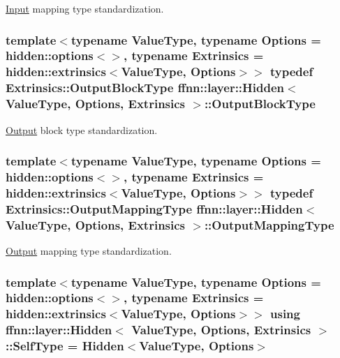 \hyperlink{classffnn_1_1layer_1_1_input}{Input} mapping type standardization. 

\hypertarget{classffnn_1_1layer_1_1_hidden_a9fd326932b57e1d86d86bdb168822727}{
\subsubsection[{Output\-Block\-Type}]{\setlength{\rightskip}{0pt plus 5cm}template$<$typename Value\-Type, typename Options = hidden\-::options$<$$>$, typename Extrinsics = hidden\-::extrinsics$<$\-Value\-Type, Options$>$$>$ typedef Extrinsics\-::\-Output\-Block\-Type {\bf ffnn\-::layer\-::\-Hidden}$<$ Value\-Type, Options, Extrinsics $>$\-::{\bf Output\-Block\-Type}}}\label{classffnn_1_1layer_1_1_hidden_a9fd326932b57e1d86d86bdb168822727}


\hyperlink{classffnn_1_1layer_1_1_output}{Output} block type standardization. 

\hypertarget{classffnn_1_1layer_1_1_hidden_a9d882e035c7cd80ccd9b58fbe832591e}{
\subsubsection[{Output\-Mapping\-Type}]{\setlength{\rightskip}{0pt plus 5cm}template$<$typename Value\-Type, typename Options = hidden\-::options$<$$>$, typename Extrinsics = hidden\-::extrinsics$<$\-Value\-Type, Options$>$$>$ typedef Extrinsics\-::\-Output\-Mapping\-Type {\bf ffnn\-::layer\-::\-Hidden}$<$ Value\-Type, Options, Extrinsics $>$\-::{\bf Output\-Mapping\-Type}}}\label{classffnn_1_1layer_1_1_hidden_a9d882e035c7cd80ccd9b58fbe832591e}


\hyperlink{classffnn_1_1layer_1_1_output}{Output} mapping type standardization. 

\hypertarget{classffnn_1_1layer_1_1_hidden_a48f525146f2e73caf51aa404f38cdb75}{
\subsubsection[{Self\-Type}]{\setlength{\rightskip}{0pt plus 5cm}template$<$typename Value\-Type, typename Options = hidden\-::options$<$$>$, typename Extrinsics = hidden\-::extrinsics$<$\-Value\-Type, Options$>$$>$ using {\bf ffnn\-::layer\-::\-Hidden}$<$ Value\-Type, Options, Extrinsics $>$\-::{\bf Self\-Type} =  {\bf Hidden}$<$Value\-Type, Options$>$}}\label{classffnn_1_1layer_1_1_hidden_a48f525146f2e73caf51aa404f38cdb75}


